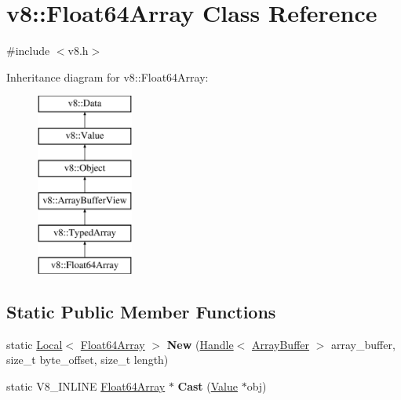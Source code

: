 \hypertarget{classv8_1_1_float64_array}{}\section{v8\+:\+:Float64\+Array Class Reference}
\label{classv8_1_1_float64_array}


{\ttfamily \#include $<$v8.\+h$>$}

Inheritance diagram for v8\+:\+:Float64\+Array\+:\begin{figure}[H]
\begin{center}
\leavevmode
\includegraphics[height=6.000000cm]{classv8_1_1_float64_array}
\end{center}
\end{figure}
\subsection*{Static Public Member Functions}
\begin{DoxyCompactItemize}
\item 
\hypertarget{classv8_1_1_float64_array_ae09a38a945fb88065956e1d87132f0b4}{}static \hyperlink{classv8_1_1_local}{Local}$<$ \hyperlink{classv8_1_1_float64_array}{Float64\+Array} $>$ {\bfseries New} (\hyperlink{classv8_1_1_handle}{Handle}$<$ \hyperlink{classv8_1_1_array_buffer}{Array\+Buffer} $>$ array\+\_\+buffer, size\+\_\+t byte\+\_\+offset, size\+\_\+t length)\label{classv8_1_1_float64_array_ae09a38a945fb88065956e1d87132f0b4}

\item 
\hypertarget{classv8_1_1_float64_array_a936ee8e8cb2cb892cc5369e3ee6a7784}{}static V8\+\_\+\+I\+N\+L\+I\+N\+E \hyperlink{classv8_1_1_float64_array}{Float64\+Array} $\ast$ {\bfseries Cast} (\hyperlink{classv8_1_1_value}{Value} $\ast$obj)\label{classv8_1_1_float64_array_a936ee8e8cb2cb892cc5369e3ee6a7784}

\end{DoxyCompactItemize}
